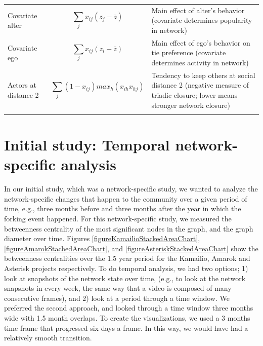 \documentclass[11pt]{report}
\begin{document}
\begin{table}[!ht]
\begin{tabular}{m{} m{} m{}}
Covariate alter & \begin{equation*} \sum_j x_{ij} (z_j - \bar z) \end{equation*} & Main effect of alter's behavior (covariate determines popularity in network) \\ 
Covariate ego & \begin{equation*} \sum_j x_{ij} (z_i - \bar z) \end{equation*} & Main effect of ego's behavior on tie preference (covariate determines activity in network) \\
Actors at distance 2 & \begin{equation*} \sum_j (1 - x_{ij}) max_h (x_{ih}x_{hj}) \end{equation*} & Tendency to keep others at social distance 2 (negative measure of triadic closure; lower means stronger network closure) \\ 
\noalign{\smallskip}\hline
\end{tabular}
\end{table}
\section{Initial study: Temporal network-specific analysis}
\label{sectionInitialStudy}
In our initial study\cite{AzarbakhtOpenSym2013}\cite{AzarbakhtOSS2013}\cite{AzarbakhtVLHCC2014}, which was a network-specific study, we wanted to analyze the network-specific changes that happen to the community over a given period of time, e.g., three months before and three months after the year in which the forking event happened. For this network-specific study, we measured the betweenness centrality \cite{Brandes} of the most significant nodes in the graph, and the graph diameter over time. Figures \ref{figureKamailioStackedAreaChart}, \ref{figureAmarokStachedAreaChart}, and \ref{figureAsteriskStackedAreaChart} show the betweenness centralities over the 1.5 year period for the Kamailio, Amarok and Asterisk projects respectively. To do temporal analysis, we had two options; 1) look at snapshots of the network state over time, (e.g., to look at the network snapshots in every week, the same way that a video is composed of many consecutive frames), and 2) look at a period through a time window. We preferred the second approach, and looked through a time window three months wide with 1.5 month overlaps. To create the visualizations, we used a 3 months time frame that progressed six days a frame. In this way, we would have had a relatively smooth transition.
\end{document}
